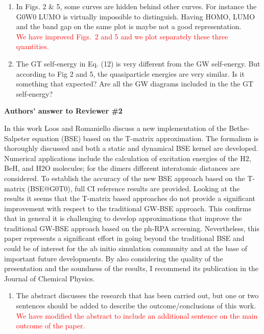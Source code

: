 \documentclass[10pt]{letter}
\newcommand{\alert}[1]{\textcolor{red}{#1}}
\begin{document}
\begin{letter}
\begin{enumerate}
\item 
{In Figs. 2 \& 5, some curves are hidden behind other curves. For instance the G0W0 LUMO is virtually impossible to distinguish. 
Having HOMO, LUMO and the band gap on the same plot is maybe not a good representation.}
\\
\alert{
We have improved Figs.~2 and 5 and we plot separately these three quantities.
}

\item 
{The GT self-energy in Eq. (12) is very different from the GW self-energy. 
But according to Fig 2 and 5, the quasiparticle energies are very similar. 
Is it something that expected? 
Are all the GW diagrams included in the the GT self-energy?}
\\
\alert{
}

\end{enumerate}

\noindent \textbf{\large Authors' answer to Reviewer \#2}

{In this work Loos and Romaniello discuss a new implementation of the Bethe-Salpeter equation (BSE) based on the T-matrix approximation. The formalism is thoroughly discussed and both a static and dynamical BSE kernel are developed. Numerical applications include the calculation of excitation energies of the H2, BeH, and H2O molecules; for the dimers different interatomic distances are considered. To establish the accuracy of the new BSE approach based on the T-matrix (BSE@G0T0), full CI reference results are provided. 
Looking at the results it seems that the T-matrix based approaches do not provide a significant improvement with respect to the traditional GW-BSE approach. This confirms that in general it is challenging to develop approximations that improve the traditional GW-BSE approach based on the ph-RPA screening. 
Nevertheless, this paper represents a significant effort in going beyond the traditional BSE and could be of interest for the ab initio simulation community and at the base of important future developments. By also considering the quality of the presentation and the soundness of the results, I recommend its publication in the Journal of Chemical Physics.}
\\
\alert{
}

\begin{enumerate}

\item 
{The abstract discusses the research that has been carried out, but one or two sentences should be added to describe the outcome/conclusions of this work.}
\\
\alert{
We have modified the abstract to include an additional sentence on the main outcome of the paper.
}


\end{enumerate}
\end{letter}
\end{document}
